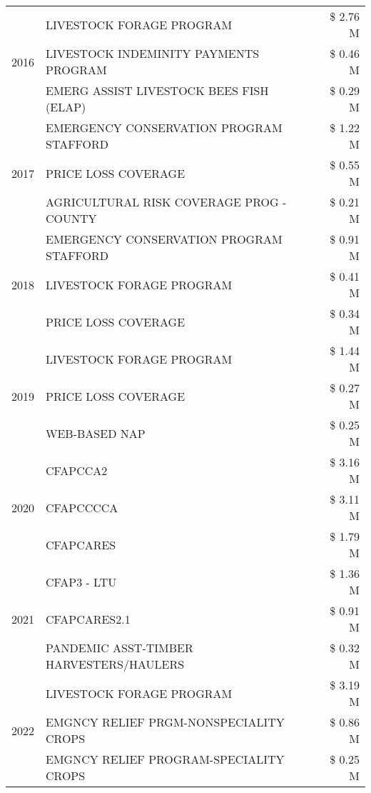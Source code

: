 \begin{tabular}{llr}
\cline{1-3}
\multirow[t]{3}{*}{2016} & LIVESTOCK FORAGE PROGRAM & \$ 2.76 M \\
 & LIVESTOCK INDEMINITY PAYMENTS PROGRAM & \$ 0.46 M \\
 & EMERG ASSIST LIVESTOCK BEES FISH (ELAP) & \$ 0.29 M \\
\cline{1-3}
\multirow[t]{3}{*}{2017} & EMERGENCY CONSERVATION PROGRAM STAFFORD & \$ 1.22 M \\
 & PRICE LOSS COVERAGE & \$ 0.55 M \\
 & AGRICULTURAL RISK COVERAGE PROG - COUNTY & \$ 0.21 M \\
\cline{1-3}
\multirow[t]{3}{*}{2018} & EMERGENCY CONSERVATION PROGRAM STAFFORD & \$ 0.91 M \\
 & LIVESTOCK FORAGE PROGRAM & \$ 0.41 M \\
 & PRICE LOSS COVERAGE & \$ 0.34 M \\
\cline{1-3}
\multirow[t]{3}{*}{2019} & LIVESTOCK FORAGE PROGRAM & \$ 1.44 M \\
 & PRICE LOSS COVERAGE & \$ 0.27 M \\
 & WEB-BASED NAP & \$ 0.25 M \\
\cline{1-3}
\multirow[t]{3}{*}{2020} & CFAPCCA2 & \$ 3.16 M \\
 & CFAPCCCCA & \$ 3.11 M \\
 & CFAPCARES & \$ 1.79 M \\
\cline{1-3}
\multirow[t]{3}{*}{2021} & CFAP3 - LTU & \$ 1.36 M \\
 & CFAPCARES2.1 & \$ 0.91 M \\
 & PANDEMIC ASST-TIMBER HARVESTERS/HAULERS & \$ 0.32 M \\
\cline{1-3}
\multirow[t]{3}{*}{2022} & LIVESTOCK FORAGE PROGRAM & \$ 3.19 M \\
 & EMGNCY RELIEF PRGM-NONSPECIALITY CROPS & \$ 0.86 M \\
 & EMGNCY RELIEF PROGRAM-SPECIALITY CROPS & \$ 0.25 M \\
\cline{1-3}
\bottomrule
\end{tabular}
